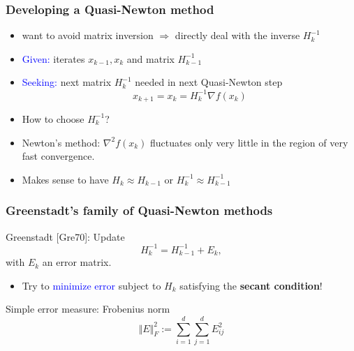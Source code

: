 \documentclass[aspectratio=149]{beamer}
\begin{document}
\begin{frame}
  \frametitle{Developing a Quasi-Newton method}
  \begin{itemize}
    \item want to avoid matrix inversion
          $\Rightarrow$ directly deal with the inverse $H_k^{-1}$
    \item \textcolor{blue}{Given:} iterates $x_{k-1}, x_k$ and matrix $H_{k-1}^{-1}$
    \item \textcolor{blue}{Seeking:} next matrix $H_k^{-1}$ needed in next Quasi-Newton step
          \begin{equation}
            x_{k+1} = x_k = H_k^{-1} \nabla f(x_k)
          \end{equation}
    \item How to choose $H_k^{-1}$?
    \item Newton’s method: $\nabla^2 f(x_k)$ fluctuates only very little in the region of very fast convergence.
    \item Makes sense to have $H_k \approx H_{k-1}$ or $H_k^{-1} \approx H_{k-1}^{-1}$
  \end{itemize}
\end{frame}


\begin{frame}
  \frametitle{Greenstadt's family of Quasi-Newton methods}
  Greenstadt [Gre70]: Update
  \begin{equation}
    H_k^{-1} = H_{k-1}^{-1} + E_k,
  \end{equation}
  with $E_k$ an error matrix.
  \begin{itemize}
    \item Try to \textcolor{blue}{minimize error} subject to $H_k$ satisfying the \textbf{secant condition}!
  \end{itemize}

  Simple error measure: Frobenius norm
  \begin{equation}
    \Vert E \Vert_F^2 := \sum_{i=1}^{d} \sum_{j=1}^{d} E_{ij}^2
  \end{equation}
\end{frame}
\end{document}
